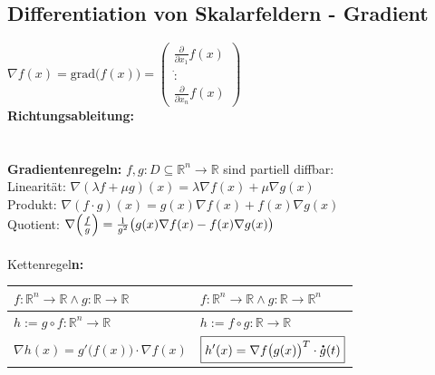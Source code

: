 \documentclass[6pt,a4paper]{scrartcl}
\let\olddot = \dot
\newcommand{\norm}[1]{\ensuremath{\|#1\|}}														%
\newcommand{\svdots}{\ensuremath{\olddot :}}													%
\renewcommand{\vec}[1]{\ensuremath{\underline{\boldsymbol {#1}}}}								%
\renewcommand{\emph}[1]{\textbf{#1}}															%
\renewcommand*{\dot}[1]{\accentset{\mbox{\textrm{\large\bfseries .}} }{#1}}						%
\begin{document}
\begin{multicols}{4}
\subsection{Differentiation von Skalarfeldern - Gradient}
$\nabla f(x) = \mathrm{grad} \bigl( f(x) \bigr) = \begin{pmatrix}  \frac{\partial}{\partial x_1} f(x) \\ \svdots \\ \frac{\partial}{\partial x_n} f(x) \end{pmatrix}$\\
\emph{Richtungsableitung:} \boxed { \partial_{\vec v} f(x) = \left\langle \nabla f(x), \vec v \right\rangle } \quad \boxed{ \norm{\vec v}=1 }\\
\\
\\
\textbf{Gradientenregeln:} $f,g:D \subseteq \mathbb R^n \rightarrow \mathbb R$ sind partiell diffbar:\\
Linearität: $\nabla(\lambda f + \mu g) (x) = \lambda \nabla f(x) + \mu \nabla g(x)$\\
Produkt: $\nabla (f \cdot g) (x) = g(x) \nabla f(x) + f(x) \nabla g(x)$\\
Quotient: $\nabla \Bigl( \frac{f}{g} \Bigr) = \frac{1}{g^2} \bigl( g(x)\nabla f(x) - f(x) \nabla g(x) \bigr)$\\
\\
Kettenregel\textbf{n:}\\
\begin{tabular}{l|l}
	$f:\mathbb R^n \rightarrow \mathbb R \land g:\mathbb R \rightarrow \mathbb R$ & $f:\mathbb R^n \rightarrow \mathbb R \land g:\mathbb R \rightarrow \mathbb R^n$\\ \midrule
	$h:= g \circ f: \mathbb R^n \rightarrow \mathbb R$	& $h:= f \circ g: \mathbb R \rightarrow \mathbb R$\\
	$\boxed{ \nabla h(x) = g'\big( f(x) \big) \cdot \nabla f(x)}$  &  $\boxed{h'(x)=\nabla f\big( g(x) \big)^T \cdot \dot g(t)}$
\end{tabular}


\end{multicols}
\end{document}
